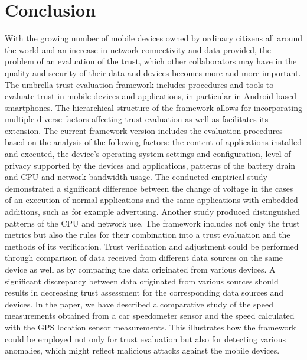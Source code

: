 \section{Conclusion}
With the growing number of mobile devices owned by ordinary citizens all around the world and an increase 
in network connectivity and data provided, the problem of an evaluation of the trust, which other collaborators may have in 
the quality and security of their data and devices becomes more and more important. The umbrella trust evaluation 
framework 
includes procedures and tools to evaluate trust in mobile devices and applications, in particular in Android based smartphones. 
The  hierarchical structure of the framework allows for incorporating multiple diverse factors affecting trust evaluation as well as facilitates its extension.
The current framework version includes the evaluation procedures based on the analysis of the following factors: the content of applications installed and executed, the device’s operating system settings and configuration, level of privacy supported by the devices and applications, patterns of the battery drain and CPU and network bandwidth usage. The conducted empirical study demonstrated a significant difference between the change of voltage in the cases of an execution of normal applications and the same applications with embedded additions, such as for example advertising. Another study produced distinguished patterns of the CPU and network use.
The framework includes not only the trust metrics but also the rules for their combination into a trust
evaluation and the methods of its verification. 
Trust verification and adjustment could be performed through comparison of data received from different data sources on the 
same device as well as by comparing the data originated from various devices. A significant discrepancy between data 
originated from various sources should results in decreasing trust assessment for the corresponding data sources and devices. 
In the paper, we have described a comparative study of the speed measurements obtained from a car speedometer sensor 
and the speed calculated 
with the GPS location sensor measurements. This illustrates how the framework could be employed not only for trust evaluation 
but also for detecting various anomalies, which might reflect malicious attacks against the mobile devices.
